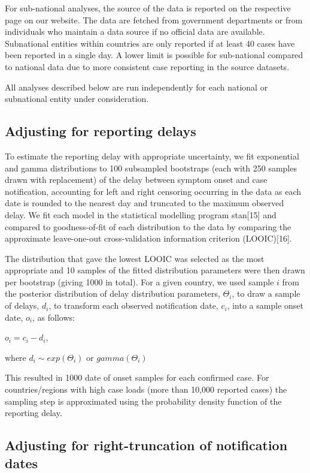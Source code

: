 \documentclass[]{article}
\begin{document}
For sub-national analyses, the source of the data is reported on the
respective page on our website. The data are fetched from government
departments or from individuals who maintain a data source if no
official data are available. Subnational entities within countries are
only reported if at least 40 cases have been reported in a single day. A
lower limit is possible for sub-national compared to national data due
to more consistent case reporting in the source datasets.

All analyses described below are run independently for each national or
subnational entity under consideration.

\hypertarget{adjusting-for-reporting-delays}{%
\subsection{Adjusting for reporting
delays}\label{adjusting-for-reporting-delays}}

To estimate the reporting delay with appropriate uncertainty, we fit
exponential and gamma distributions to 100 subsampled bootstraps (each
with 250 samples drawn with replacement) of the delay between symptom
onset and case notification, accounting for left and right censoring
occurring in the data as each date is rounded to the nearest day and
truncated to the maximum observed delay. We fit each model in the
statistical modelling program stan{[}15{]} and compared to
goodness-of-fit of each distribution to the data by comparing the
approximate leave-one-out cross-validation information criterion
(LOOIC){[}16{]}.

The distribution that gave the lowest LOOIC was selected as the most
appropriate and 10 samples of the fitted distribution parameters were
then drawn per bootstrap (giving 1000 in total). For a given country, we
used sample \(i\) from the posterior distribution of delay distribution
parameters, \(\Theta_i\), to draw a sample of delays, \(d_i\), to
transform each observed notification date, \(c_i\), into a sample onset
date, \(o_i\), as follows:

\(o_i = c_i - d_i\),

where \(d_i \sim exp(\Theta_i)\) or \(gamma(\Theta_i)\)

This resulted in 1000 date of onset samples for each confirmed case. For
countries/regions with high case loads (more than 10,000 reported cases)
the sampling step is approximated using the probability density function
of the reporting delay.

\hypertarget{adjusting-for-right-truncation-of-notification-dates}{%
\subsection{Adjusting for right-truncation of notification
dates}\label{adjusting-for-right-truncation-of-notification-dates}}
\end{document}
